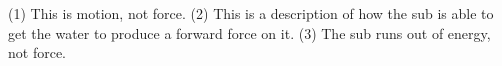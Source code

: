 (1) This is motion, not force. (2) This is a description of how the
 sub is able to get the water to produce a forward
force on it. (3) The sub runs out of energy, not force.





